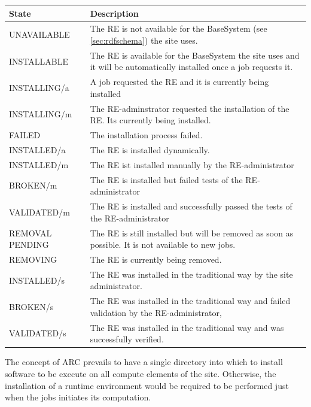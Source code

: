 \begin{table}[!h]
 \begin{center}
 \begin{tabular}{lp{12cm}}
 State&Description\\
 \hline
 UNAVAILABLE&
	The RE is not available for the BaseSystem (see \ref{sec:rdfschema}) the site uses. \\
 INSTALLABLE&
	The RE is available for the BaseSystem the site uses and it
	will be automatically installed once a job requests it. \\
 INSTALLING/a&
	A job requested the RE and it is currently being installed \\
 INSTALLING/m&
	The RE-adminstrator requested the installation of the RE. Its
	currently being installed. \\
 FAILED&
	The installation process failed. \\
 INSTALLED/a&
	The RE is installed dynamically. \\
 INSTALLED/m&
	The RE ist installed manually by the RE-administrator \\
 BROKEN/m&
	The RE is installed but failed tests of the RE-administrator \\
 VALIDATED/m&
	The RE is installed and successfully passed the tests of the
	RE-administrator \\
 REMOVAL PENDING&
	The RE is still installed but will be removed as soon as
	possible. It is not available to new jobs. \\
 REMOVING&
	The RE is currently being removed. \\
 INSTALLED/s&
	The RE was installed in the traditional way by the site administrator. \\
 BROKEN/s&
	The RE was installed in the traditional way and failed
	validation by the RE-administrator, \\
 VALIDATED/s&
	The RE was installed in the traditional way and was
	successfully verified.
 \\
 \end{tabular}
 \end{center}
 \label{tab:states}
\end{table}

The concept of ARC prevails to have a single directory into which to
install software to be execute on all compute elements of the site.
Otherwise, the installation of a runtime environment would be
required to be performed just when the jobs initiates its computation.

